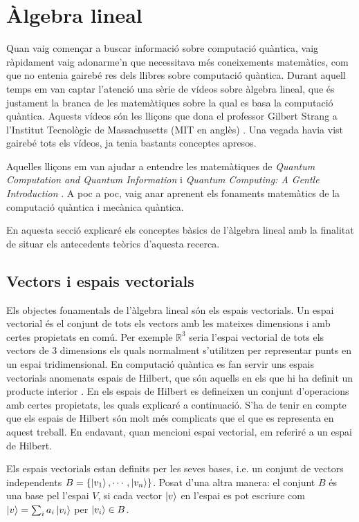 

\chapter{Àlgebra lineal}\label{algebra}
Quan vaig començar a buscar informació sobre computació quàntica, vaig ràpidament vaig adonarme'n que necessitava més coneixements matemàtics, com que no entenia gairebé res dels llibres sobre computació quàntica. Durant aquell temps em van captar l'atenció una sèrie de vídeos sobre àlgebra lineal, que és justament la branca de les matemàtiques sobre la qual es basa la computació quàntica. Aquests vídeos són les lliçons que dona el professor Gilbert Strang a l'Institut Tecnològic de Massachusetts (MIT en anglès) \cite{LA_OCW_strang, LA2_OCW_strang}. Una vegada havia vist gairebé tots els vídeos, ja tenia bastants conceptes apresos.

Aquelles lliçons em van ajudar a entendre les matemàtiques de \textit{Quantum Computation and Quantum Information} \cite{QCandQI} i \textit{Quantum Computing: A Gentle Introduction} \cite{QC_intro}. A poc a poc, vaig anar aprenent els fonaments matemàtics de la computació quàntica i mecànica quàntica.

En aquesta secció explicaré els conceptes bàsics de l'àlgebra lineal amb la finalitat de situar els antecedents teòrics d'aquesta recerca. 

\section{Vectors i espais vectorials}
Els objectes fonamentals de l'àlgebra lineal són els espais vectorials. Un espai vectorial és el conjunt de tots els vectors amb les mateixes dimensions i amb certes propietats en comú. Per exemple $\mathbb{R}^{3}$ seria l'espai vectorial de tots els vectors de 3 dimensions els quals normalment s'utilitzen per representar punts en un espai tridimensional. En computació quàntica es fan servir uns espais vectorials anomenats espais de Hilbert, que són aquells en els que hi ha definit un producte interior \cite{QCandQI:GramSchmidt}. En els espais de Hilbert es defineixen un conjunt d'operacions amb certes propietats, les quals explicaré a continuació. S'ha de tenir en compte que els espais de Hilbert són molt més complicats que el que es representa en aquest treball. En endavant, quan mencioni espai vectorial, em referiré a un espai de Hilbert.

Els espais vectorials estan definits per les seves bases, i.e. un conjunt de vectors independents $B = \{\ket{v_1}, \cdots, \ket{v_n}\}$. Posat d'una altra manera: el conjunt $B$ és una base pel l'espai $V$, si cada vector $\ket{v}$ en l'espai es pot escriure com $\ket{v} = \sum_i a_i \ket{v_i}$ per $\ket{v_i} \in B$.

